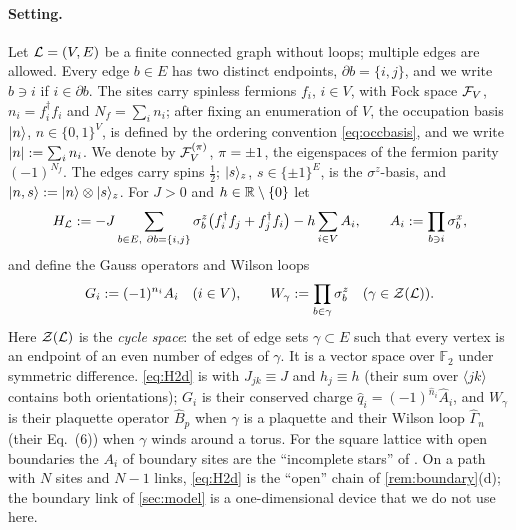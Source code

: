 \paragraph{Setting.}
Let $\mathcal{L}=(V,E)$ be a finite connected graph without loops; multiple edges are allowed.  Every edge
$b\in E$ has two distinct endpoints, $\partial b=\{i,j\}$, and we write $b\ni i$ if $i\in\partial b$.
The sites carry spinless fermions $f_i$, $i\in V$, with Fock space $\mathcal{F}_V$, $n_i=f_i^\dagger f_i$ and
$N_f=\sum_in_i$; after fixing an enumeration of $V$, the occupation basis $|n\rangle$, $n\in\{0,1\}^V$, is
defined by the ordering convention \eqref{eq:occbasis}, and we write $\left|n\right|:=\sum_in_i$.  We denote by
$\mathcal{F}_V^{(\pi)}$, $\pi=\pm1$, the eigenspaces of the fermion parity $(-1)^{N_f}$.  The edges carry spins
$\frac12$; $|s\rangle_z$, $s\in\{\pm1\}^E$, is the $\sigma^z$-basis, and $|n,s\rangle:=|n\rangle\otimes|s\rangle_z$.
For $J>0$ and $h\in\mathbb{R}\setminus\{0\}$ let
\begin{equation}\label{eq:H2d}
  H_{\mathcal{L}}:=-J\sum_{b\in E,\ \partial b=\{i,j\}}\sigma^z_b\bigl(f_i^\dagger f_j+f_j^\dagger f_i\bigr)
  -h\sum_{i\in V}A_i,\qquad A_i:=\prod_{b\ni i}\sigma^x_b ,
\end{equation}
and define the Gauss operators and Wilson loops
\begin{equation}\label{eq:G2d}
  G_i:=(-1)^{n_i}A_i\quad(i\in V),\qquad W_\gamma:=\prod_{b\in\gamma}\sigma^z_b\quad(\gamma\in\mathcal{Z}(\mathcal{L})).
\end{equation}
Here $\mathcal{Z}(\mathcal{L})$ is the \emph{cycle space}: the set of edge sets $\gamma\subset E$ such that every
vertex is an endpoint of an even number of edges of $\gamma$.  It is a vector space over $\mathbb F_2$
under symmetric difference.  \eqref{eq:H2d} is \cite[Eqs.~(1)--(2)]{SKKM2018} with $J_{jk}\equiv J$ and
$h_j\equiv h$ (their sum over $\langle jk\rangle$ contains both orientations); $G_i$ is their conserved
charge $\hat q_i=(-1)^{\hat n_i}\hat A_i$, and $W_\gamma$ is their plaquette operator $\hat B_p$ when $\gamma$
is a plaquette and their Wilson loop $\hat\Gamma_n$ (their Eq.~(6)) when $\gamma$ winds around a torus.  For
the square lattice with open boundaries the $A_i$ of boundary sites are the ``incomplete stars'' of
\cite[Fig.~1]{SKKM2018}.  On a path with $N$ sites and $N-1$ links, \eqref{eq:H2d} is the ``open'' chain
of \cref{rem:boundary}(d); the boundary link of \cref{sec:model} is a one-dimensional device that we do
not use here.

